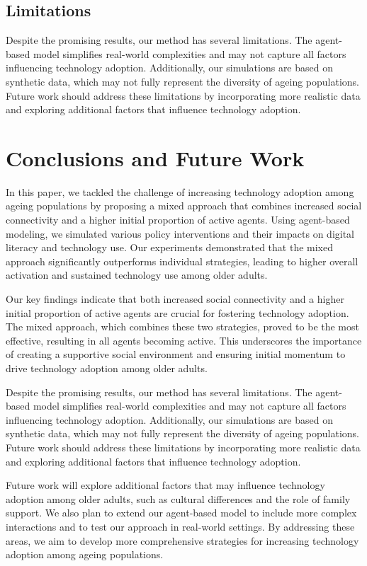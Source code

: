 \documentclass{article} %
\begin{document}
\subsection{Limitations}
Despite the promising results, our method has several limitations. The agent-based model simplifies real-world complexities and may not capture all factors influencing technology adoption. Additionally, our simulations are based on synthetic data, which may not fully represent the diversity of ageing populations. Future work should address these limitations by incorporating more realistic data and exploring additional factors that influence technology adoption.

\section{Conclusions and Future Work}
\label{sec:conclusion}

In this paper, we tackled the challenge of increasing technology adoption among ageing populations by proposing a mixed approach that combines increased social connectivity and a higher initial proportion of active agents. Using agent-based modeling, we simulated various policy interventions and their impacts on digital literacy and technology use. Our experiments demonstrated that the mixed approach significantly outperforms individual strategies, leading to higher overall activation and sustained technology use among older adults.

Our key findings indicate that both increased social connectivity and a higher initial proportion of active agents are crucial for fostering technology adoption. The mixed approach, which combines these two strategies, proved to be the most effective, resulting in all agents becoming active. This underscores the importance of creating a supportive social environment and ensuring initial momentum to drive technology adoption among older adults.

Despite the promising results, our method has several limitations. The agent-based model simplifies real-world complexities and may not capture all factors influencing technology adoption. Additionally, our simulations are based on synthetic data, which may not fully represent the diversity of ageing populations. Future work should address these limitations by incorporating more realistic data and exploring additional factors that influence technology adoption.

Future work will explore additional factors that may influence technology adoption among older adults, such as cultural differences and the role of family support. We also plan to extend our agent-based model to include more complex interactions and to test our approach in real-world settings. By addressing these areas, we aim to develop more comprehensive strategies for increasing technology adoption among ageing populations.






\end{document}

